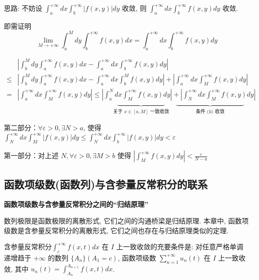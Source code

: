 \documentclass[lang=cn,newtx,10pt,scheme=chinese]{elegantbook}
\begin{document}
\begin{note}
思路: 不妨设 $\int_{a}^{+\infty} dx \int_{b}^{+\infty} |f(x,y)|dy$ 收敛, 则 $\int_{a}^{+\infty} dx \int_{b}^{+\infty} f(x,y)dy$ 收敛.

即需证明
$$ \lim\limits_{M \to +\infty} \int_{a}^{M} dy \int_{b}^{+\infty} f(x,y)dx = \int_{a}^{+\infty} dx \int_{b}^{+\infty} f(x,y)dy $$

\begin{align*}
& \left| \int_{b}^{M} dy \int_{a}^{+\infty} f(x,y)dx - \int_{a}^{+\infty} dx \int_{b}^{+\infty} f(x,y)dy \right| \\
\le & \left| \int_{b}^{M} dy \int_{a}^{+\infty} f(x,y)dx - \int_{a}^{+\infty} dx \int_{b}^{M} f(x,y)dy \right| + \left| \int_{a}^{+\infty} dx \int_{M}^{+\infty} f(x,y)dy \right| \\
= & \left| \int_{a}^{+\infty} dx \int_{M}^{+\infty} f(x,y)dy \right| \le \left| \int_{a}^{N} dx \int_{M}^{+\infty} f(x,y)dy \right| + \left| \int_{N}^{+\infty} dx \int_{M}^{+\infty} f(x,y)dy \right| \\
& \qquad \qquad \qquad \qquad \qquad \qquad \qquad \underset{\text{关于 } x \in [a, M] \text{ 一致收敛}}{\underbrace{ \qquad \qquad \qquad \quad}} \quad \underset{\text{条件 (ii) 收敛}}{\underbrace{\qquad \qquad \qquad \qquad \qquad}}
\end{align*}

第二部分：$\forall \varepsilon > 0, \exists N > a$, 使得 $\int_{N}^{+\infty} dx \int_{M}^{+\infty} |f(x,y)|dy \le \int_{N}^{+\infty} dx \int_{b}^{+\infty} |f(x,y)|dy < \varepsilon$

第一部分：对上述 $N, \forall \varepsilon > 0, \exists M > b$ 使得 $|\int_{M}^{+\infty} f(x,y)dy| < \frac{\varepsilon}{N-a}$

\end{note}

\subsection{函数项级数(函数列)与含参量反常积分的联系}

\textbf{函数项级数与含参量反常积分之间的“归结原理”}

数列极限是函数极限的离散形式, 它们之间的沟通桥梁是归结原理. 本章中, 函数项级数是含参量反常积分的离散形式, 它们之间也存在与归结原理类似的定理.

\begin{proposition}[含参量反常积分的归结原理]
含参量反常积分$\int_{c}^{+\infty} f(x, t) dx$ 在 $I$ 上一致收敛的充要条件是: 对任意严格单调递增趋于 $+\infty$ 的数列 $\{A_n\}(A_1=c)$, 函数项级数 $\sum_{n=1}^{+\infty} u_n(t)$ 在 $I$ 上一致收敛, 其中 $u_n(t) = \int_{A_n}^{A_{n+1}} f(x, t) dx$.
\end{proposition}
\end{document}
